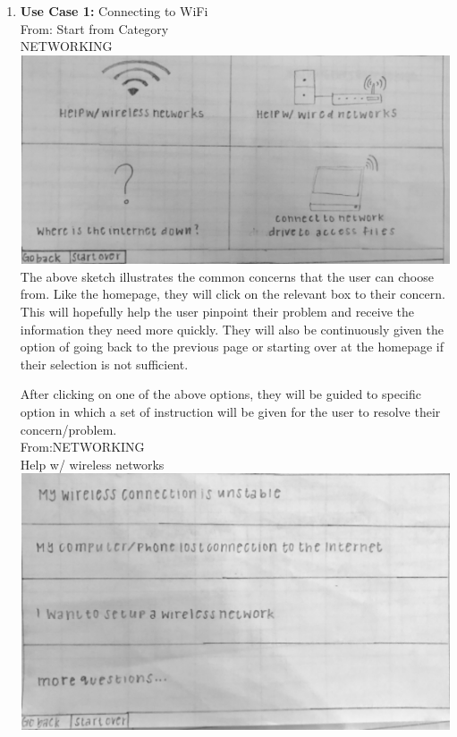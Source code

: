 \documentclass[12pt, letterpaper]{article}
\begin{document}
\begin{enumerate}
	\item \textbf{Use Case 1:} Connecting to WiFi
	\\From: Start from Category
    \\NETWORKING
    \\\includegraphics[scale=.75]{network.png}
    \\The above sketch illustrates the common concerns that the user can choose from.  Like the homepage, they will click on the relevant box to their concern.  This will hopefully help the user pinpoint their problem and receive the information they need more quickly.  They will also be continuously given the option of going back to the previous page or starting over at the homepage if their selection is not sufficient.  
    
    After clicking on one of the above options, they will be guided to specific option in which a set of instruction will be given for the user to resolve their concern/problem.
    \\From:NETWORKING
    \\Help w/ wireless networks
    \\\includegraphics[scale=.75]{network_questions.png}
    

\end{enumerate}
\end{document}

